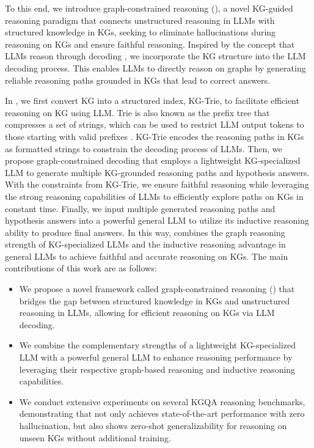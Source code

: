 To this end, we introduce graph-constrained reasoning (\ourmethod), a novel KG-guided reasoning paradigm that connects unstructured reasoning in LLMs with structured knowledge in KGs, seeking to eliminate hallucinations during reasoning on KGs and ensure faithful reasoning. Inspired by the concept that LLMs reason through decoding \citep{wei2022chain}, we incorporate the KG structure into the LLM decoding process. This enables LLMs to directly reason on graphs by generating reliable reasoning paths grounded in KGs that lead to correct answers.

In \ourmethod, we first convert KG into a structured index, KG-Trie, to facilitate efficient reasoning on KG using LLM. Trie is also known as the prefix tree \citep{wiki:trie} that compresses a set of strings, which can be used to restrict LLM output tokens to those starting with valid prefixes \citep{deautoregressive,xie2022discrimination}. KG-Trie encodes the reasoning paths in KGs as formatted strings to constrain the decoding process of LLMs. Then, we propose graph-constrained decoding that employs a lightweight KG-specialized LLM to generate multiple KG-grounded reasoning paths and hypothesis answers. With the constraints from KG-Trie, we ensure faithful reasoning while leveraging the strong reasoning capabilities of LLMs to efficiently explore paths on KGs in constant time. Finally, we input multiple generated reasoning paths and hypothesis answers into a powerful general LLM to utilize its inductive reasoning ability to produce final answers. In this way, \ourmethod combines the graph reasoning strength of KG-specialized LLMs and the inductive reasoning advantage in general LLMs to achieve faithful and accurate reasoning on KGs.
%
The main contributions of this work are as follows:
\begin{itemize}
    \item We propose a novel framework called graph-constrained reasoning (\ourmethod) that bridges the gap between structured knowledge in KGs and unstructured reasoning in LLMs, allowing for efficient reasoning on KGs via LLM decoding.
    \item We combine the complementary strengths of a lightweight KG-specialized LLM with a powerful general LLM to enhance reasoning performance by leveraging their respective graph-based reasoning and inductive reasoning capabilities.
    \item We conduct extensive experiments on several KGQA reasoning benchmarks, demonstrating that \ourmethod not only achieves state-of-the-art performance with zero hallucination, but also shows zero-shot generalizability for reasoning on unseen KGs without additional training.
\end{itemize}